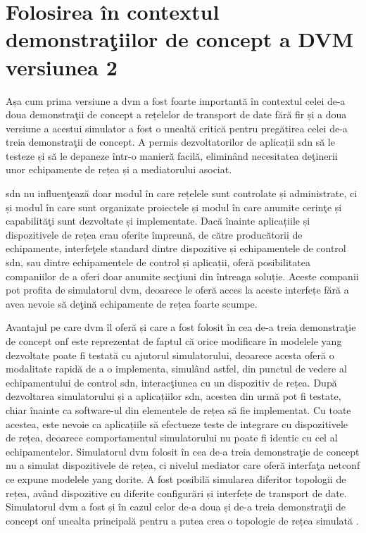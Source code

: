 \section{Folosirea în contextul demonstraţiilor de concept a DVM versiunea 2}

Așa cum prima versiune a \gls{dvm} a fost foarte importantă în contextul celei de-a doua demonstraţii de concept a rețelelor de transport de date fără fir și a doua versiune a acestui simulator a fost o unealtă critică pentru pregătirea celei de-a treia demonstraţii de concept. A permis dezvoltatorilor de aplicații \gls{sdn} să le testeze și să le depaneze într-o manieră facilă, eliminând necesitatea deţinerii unor echipamente de rețea și a mediatorului asociat.

\gls{sdn} nu influenţează doar modul în care rețelele sunt controlate și administrate, ci și modul în care sunt organizate proiectele și modul în care anumite cerinţe și capabilităţi sunt dezvoltate și implementate. Dacă înainte aplicațiile și dispozitivele de rețea erau oferite împreună, de către producătorii de echipamente, interfeţele standard dintre dispozitive și echipamentele de control \gls{sdn}, sau dintre echipamentele de control și aplicații, oferă posibilitatea companiilor de a oferi doar anumite secţiuni din întreaga soluție. Aceste companii pot profita de simulatorul \gls{dvm}, deoarece le oferă acces la aceste interfețe fără a avea nevoie să deţină echipamente de rețea foarte scumpe.

Avantajul pe care \gls{dvm} îl oferă și care a fost folosit în cea de-a treia demonstraţie de concept \gls{onf} este reprezentat de faptul că orice modificare în modelele \gls{yang} dezvoltate poate fi testată cu ajutorul simulatorului, deoarece acesta oferă o modalitate rapidă de a o implementa, simulând astfel, din punctul de vedere al echipamentului de control \gls{sdn}, interacţiunea cu un dispozitiv de rețea. După dezvoltarea simulatorului și a aplicațiilor \gls{sdn}, acestea din urmă pot fi testate, chiar înainte ca software-ul din elementele de rețea să fie implementat. Cu toate acestea, este nevoie ca aplicațiile să efectueze teste de integrare cu dispozitivele de rețea, deoarece comportamentul simulatorului nu poate fi identic cu cel al echipamentelor. Simulatorul \gls{dvm} folosit în cea de-a treia demonstraţie de concept nu a simulat dispozitivele de rețea, ci nivelul mediator care oferă interfaţa \gls{netconf} ce expune modelele \gls{yang} dorite. A fost posibilă simularea diferitor topologii de rețea, având dispozitive cu diferite configurări și interfețe de transport de date. Simulatorul \gls{dvm} a fost și în cazul celor de-a doua și de-a treia demonstraţii de concept \gls{onf} unealta principală pentru a putea crea o topologie de rețea simulată \cite{onf2016_poc2, onf2016_poc3}. 

